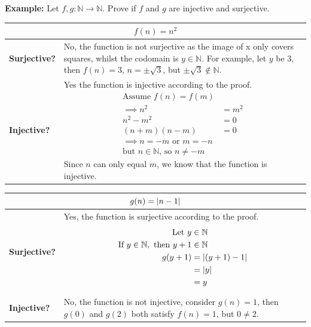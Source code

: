 \documentclass[12pt]{article}
\DeclarePairedDelimiter\abs{\lvert}{\rvert}
\newcommand{\N}{\mathbb{N}}
\theoremstyle{definition}
\begin{document}
    \newpage
    \textbf{Example:} Let $f,g: \N \to \N$. Prove if $f$ and $g$ are 
    injective and surjective.
    
    \begin{center}
        \begin{tabular}{ | m{3cm} | m{12cm} |}
            \hline
            \multicolumn{2}{|c|}{$f(n)=n^2$} \\
            \hline
            \textbf{Surjective?} &
            No, the function is not surjective as the image of x only covers squares,
            whilst the codomain is $y \in \N$. For example, let $y$ be 3, then $f(n) = 3$,
             $n = \pm \sqrt{3}$, but $\pm \sqrt{3} \notin \N$. \\
            \hline
            \textbf{Injective?} &
            Yes the function is injective according to the proof.
            \begin{equation*}\begin{aligned}
                \text{Assume } f(n) = f(m) \\
                \implies n^2 &= m^2 \\
                n^2 - m^2 &= 0 \\
                (n+m)(n-m) &= 0 \\
                \implies n=-m \text{ or } m=-n \\
                \text{but $n \in \N$, so $n \ne -m$}
            \end{aligned}\end{equation*}
            Since $n$ can only equal $m$, we know that the function is injective. \\
            \hline
        \end{tabular}
    \end{center}
    
    \begin{center}
        \begin{tabular}{ | m{3cm} | m{12cm} |}
            \hline
            \multicolumn{2}{|c|}{$g(n)=\abs{n-1}$} \\
            \hline
            \textbf{Surjective?} &
            Yes, the function is surjective according to the proof.
            \begin{equation*}\begin{aligned}
                \text{Let } y & \in \N \\
                \text{If } y \in \N, \text{ then } y+1 & \in \N \\
                g(y+1) & = \abs{(y+1)-1} \\
                & = \abs{y} \\
                & = y
            \end{aligned}\end{equation*} \\
            \hline
            \textbf{Injective?} &
            No, the function is not injective, consider $g(n) = 1$, then $g(0)$ and $g(2)$
            both satisfy $f(n)=1$, but $0 \ne 2$.\\
            \hline
        \end{tabular}
    \end{center}
    
\end{document}
